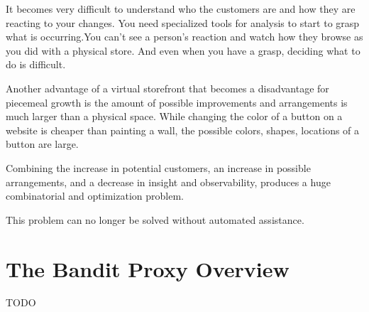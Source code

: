 \documentclass[11pt]{article}
\begin{document}
It becomes very difficult to understand who the customers are and how they are reacting
to your changes. You need specialized tools for analysis to start to grasp
what is occurring.You can't see a person's reaction and watch how they browse as you did with
a physical store. And even when you have a grasp, deciding what to do is difficult.

Another advantage of a virtual storefront that becomes a disadvantage for piecemeal growth
is the amount of possible improvements and arrangements is much larger than
a physical space. While changing the color of a button on a website is cheaper
than painting a wall, the possible colors, shapes, locations of a button are large.

Combining the increase in potential customers, an increase in possible arrangements, and a
decrease in insight and observability, produces a huge combinatorial and optimization problem.

This problem can no longer be solved without automated assistance.

\section{The Bandit Proxy Overview}

TODO
\end{document}
